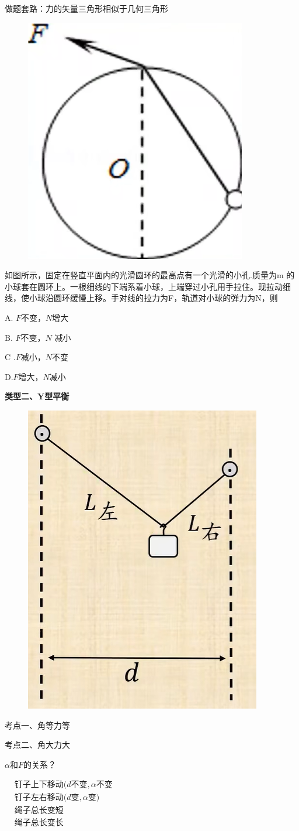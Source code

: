 \documentclass[lang=cn,10pt]{elegantbook}
\begin{document}
	做题套路：力的矢量三角形相似于几何三角形
	\begin{example}
\begin{figure}[H]
	\centering
	\includegraphics[width=0.14\linewidth]{image/26}
\end{figure}
		如图所示，固定在竖直平面内的光滑圆环的最高点有一个光滑的小孔.质量为m 的小球套在圆环上。一根细线的下端系着小球，上端穿过小孔用手拉住。现拉动细线，使小球沿圆环缓慢上移。手对线的拉力为F，轨道对小球的弹力为N，则
		
		A. $F$不变，$N$增大
		
		B. $F$不变，$N$ 减小
		
		C .$F$减小，$N$不变 
		
		D.$F$增大，$N$减小
	\end{example}
	\vspace{1cm}
	\textbf{类型二、Y型平衡}
	\begin{figure}[H]
		\centering
		\includegraphics[width=0.3\linewidth]{image/27}
	\end{figure}
	
	考点一、角等力等
	\vspace{2cm}
	
	考点二、角大力大
	
	$\alpha$和$F$的关系？
	\vspace{2cm}
	
	$\begin{aligned}
		&\text{钉子上下移动(}d\text{不变},\alpha \text{不变}\\
		&\text{钉子左右移动(}d\text{变},\alpha \text{变)}\\
		&\text{绳子总长变短}\\
		&\text{绳子总长变长}\\
	\end{aligned}$
	\vspace{1cm}
	
\end{document}
